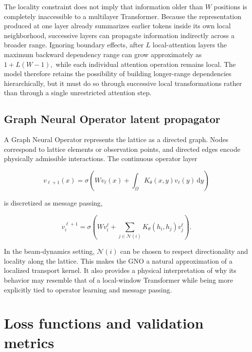 The locality constraint does not imply that information older than \(W\) positions is completely inaccessible to a multilayer Transformer. Because the representation produced at one layer already summarizes earlier tokens inside its own local neighborhood, successive layers can propagate information indirectly across a broader range. Ignoring boundary effects, after \(L\) local-attention layers the maximum backward dependency range can grow approximately as \(1 + L ( W - 1 ) ,\) while each individual attention operation remains local. The model therefore retains the possibility of building longer-range dependencies hierarchically, but it must do so through successive local transformations rather than through a single unrestricted attention step.

\subsection{Graph Neural Operator latent propagator}
\label{sec:04_machine_learning_methodology_graph_neural_operator_latent_propagator}

A Graph Neural Operator represents the lattice as a directed graph. Nodes correspond to lattice elements or observation points, and directed edges encode physically admissible interactions. The continuous operator layer

\begin{equation}
\label{eq:155}
v_{\ell+1}(x)=\sigma\left(Wv_{\ell}(x)+\int_{\Omega}K_{\theta}(x,y)v_{\ell}(y)\,\mathrm dy\right)
\end{equation}

is discretized as message passing,

\begin{equation}
\label{eq:156}
v_i^{\ell+1}=\sigma\left(Wv_i^{\ell}+\sum_{j\in\mathcal N(i)}K_{\theta}(h_i,h_j)v_j^{\ell}\right).
\end{equation}

In the beam-dynamics setting, \(\mathcal{N} ( i )\) can be chosen to respect directionality and locality along the lattice. This makes the GNO a natural approximation of a localized transport kernel. It also provides a physical interpretation of why its behavior may resemble that of a local-window Transformer while being more explicitly tied to operator learning and message passing.

\section{Loss functions and validation metrics}
\label{sec:04_machine_learning_methodology_loss_functions_and_validation_metrics}

